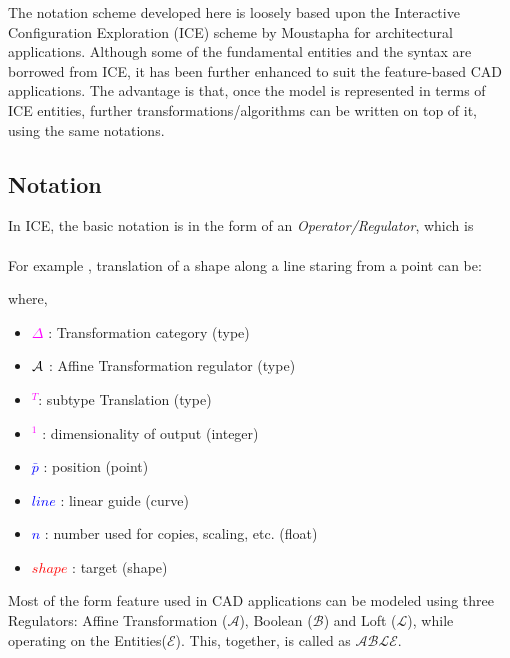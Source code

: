 The notation scheme developed here is loosely based upon the Interactive Configuration Exploration  (ICE) scheme by Moustapha \cite{Hoda2005} for architectural applications. Although some of the fundamental entities and the syntax are borrowed from ICE, it has been further enhanced to suit the feature-based CAD applications.  The advantage is that, once the model is represented in terms of ICE entities, further transformations/algorithms can be written on top of it, using the same notations.

\subsection{Notation}

In ICE, the basic notation is in the form of an {\em Operator/Regulator}, which is \\

{}\\

	 For example , translation of a shape along a line staring from a point can be:

	
	where,
		\begin{itemize}[noitemsep,topsep=0pt,parsep=0pt,partopsep=0pt,label={}]
		\item 	\textcolor{magenta}{$\Delta$} : Transformation category (type)
	     	\item 	\textcolor{magenta}{${\bf \mathcal{A}}$} : Affine Transformation regulator (type)
		\item  	\textcolor{magenta}{$^T$}: subtype Translation (type)
		 \item 	\textcolor{magenta}{$^1$} : dimensionality of output (integer)
	        \item 	\textcolor{blue}{ $\bar{p}$} : position (point)
  		\item  	\textcolor{blue}{$line$} : linear guide (curve)
		 \item  	\textcolor{blue}{$n$} : number used for copies, scaling, etc. (float)
		 \item  	\textcolor{red}{$shape$} : target (shape)
		\end{itemize}

Most of the form feature used in CAD applications can be modeled using  three Regulators: Affine Transformation ($\mathcal{A}$),  Boolean ($\mathcal{B}$) and Loft ($\mathcal{L}$), while  operating on the Entities($\mathcal{E}$).  This, together, is called as {\bf $\mathcal{ABLE}$}. 

